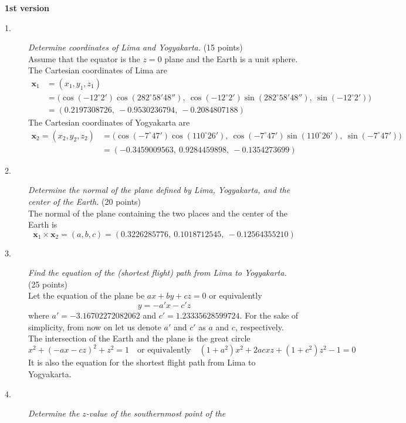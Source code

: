 \textbf{1st version}

\begin{description}
\item[1.] \emph{Determine coordinates of Lima and Yogyakarta.}
  \hfill(15 points)\\
  Assume that the equator is the $z = 0$ plane and the Earth is a unit
  sphere. The Cartesian coordinates of Lima are
  \begin{align*}
  \boldsymbol{x}_1 &= (x_1, y_1, z_1)\\
    &= \bigl(\cos(-12^\circ 2')\cos(282^\circ 58'48''),\
       \cos(-12^\circ 2')\sin(282^\circ 58'48''),\
       \sin(-12^\circ 2')\bigr)\\
    &= (0.2197308726,\ -0.9530236794,\ -0.2084807188)
  \end{align*}
  The Cartesian coordinates of Yogyakarta are
  \begin{align*}
  \boldsymbol{x}_2 = (x_2, y_2, z_2)
    &= \bigl(\cos(-7^\circ 47')\cos(110^\circ 26'),\
       \cos(-7^\circ 47')\sin(110^\circ 26'),\
       \sin(-7^\circ 47')\bigr)\\
    &= (-0.3459009563,\ 0.9284459898,\ -0.1354273699)
  \end{align*}
\item[2.] \emph{Determine the normal of the plane defined by Lima,
  Yogyakarta, and the center of the Earth.} \hfill(20 points)\\
  The normal of the plane containing the two places and the center of the
  Earth is
  \[ \boldsymbol{x}_1 \times \boldsymbol{x}_2 = (a, b, c)
     = (0.3226285776,\ 0.1018712545,\ -0.12564355210) \]
\item[3.] \emph{Find the equation of the (shortest flight) path from Lima to
  Yogyakarta.} \hfill(25 points)\\
  Let the equation of the plane be $ax + by + cz = 0$ or equivalently
  \[ y = -a'x - c'z \]
  where $a' = -3.16702272082062$ and $c' = 1.23335628599724$. For the sake
  of simplicity, from now on let us denote $a'$ and $c'$ as $a$ and $c$,
  respectively. The intersection of the Earth and the plane is the great
  circle
  \[ x^2 + (-ax - cz)^2 + z^2 = 1 \quad\text{or equivalently}\quad
     (1 + a^2)x^2 + 2acxz + (1 + c^2)z^2 - 1 = 0 \]
  It is also the equation for the shortest flight path from Lima to
  Yogyakarta.
\item[4.] \emph{Determine the $z$-value of the southernmost point of the
}
\end{description}
